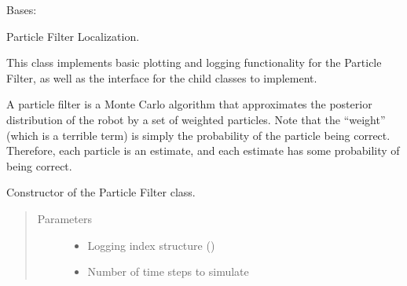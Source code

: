 \documentclass[letterpaper,10pt,english]{sphinxmanual}
\begin{document}
\begin{fulllineitems}
\label{\detokenize{particle_filter:ParticleFilter.ParticleFilter}}
\sphinxAtStartPar
Bases: {\hyperref[\detokenize{Localization:Localization.Localization}]{}}

\sphinxAtStartPar
Particle Filter Localization.

\sphinxAtStartPar
This class implements basic plotting and logging functionality for the Particle Filter,
as well as the interface for the child classes to implement.

\sphinxAtStartPar
A particle filter is a Monte Carlo algorithm that approximates the posterior distribution of the robot
by a set of weighted particles.  Note that the “weight” (which is a terrible term) is simply the 
probability of the particle being correct. Therefore, each particle is an estimate, and each estimate 
has some probability of being correct.

\begin{fulllineitems}
\label{\detokenize{particle_filter:ParticleFilter.ParticleFilter.__init__}}
\sphinxAtStartPar
Constructor of the Particle Filter class.
\begin{quote}\begin{description}
\item[{Parameters}] \leavevmode\begin{itemize}
\item {} 
\sphinxAtStartPar
{} \textendash{} Logging index structure ()

\item {} 
\sphinxAtStartPar
{} \textendash{} Number of time steps to simulate


\end{itemize}
\end{description}
\end{quote}
\end{fulllineitems}
\end{fulllineitems}
\end{document}
